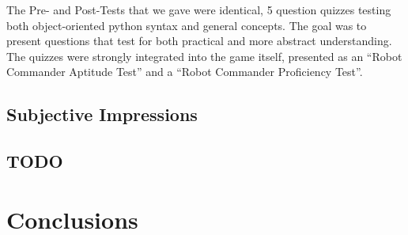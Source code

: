 \documentclass[12pt,notitlepage]{article}
\begin{document}
The Pre- and Post-Tests that we gave were identical, 5 question quizzes
testing both object-oriented python syntax and general concepts. The goal
was to present questions that test for both practical and more abstract
understanding. The quizzes were strongly integrated into the game itself,
presented as an ``Robot Commander Aptitude Test'' and a ``Robot Commander
Proficiency Test''.

\subsection{Subjective Impressions}

\subsection{TODO}

\section{Conclusions}
\end{document}
